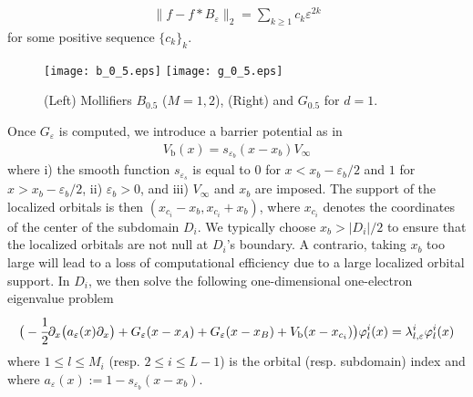 \documentclass[11pt]{elsarticle}
\let \leq \leqslant
\let \geq \geqslant
\let \epsilon \varepsilon
\begin{document}
\begin{itemize}
\begin{eqnarray*}
\|f-f*B_{\epsilon}\|_2 = \sum_{k \geq 1}c_{k}\epsilon^{2k}
\end{eqnarray*}
for some positive sequence $\{c_{k}\}_k$.
\begin{figure}[!ht]
\begin{center}
\hspace*{1mm}\texttt{[image: b\_0\_5.eps]}
\hspace*{1mm}\texttt{[image: g\_0\_5.eps]}
\caption{(Left) Mollifiers $B_{0.5}$ ($M=1,2$), (Right) and $G_{0.5}$ for $d=1$.}
\label{beps05}
\end{center}
\end{figure}
Once $G_{\epsilon}$ is computed, we introduce a barrier potential as in \cite{CAM15-09}
\begin{eqnarray}\label{BARPOT}
V_{\textrm{b}}(x) = s_{\epsilon_b}(x-x_b)V_{\infty}
\end{eqnarray}
where i) the smooth function $s_{\epsilon_s}$ is equal to $0$ for $x<x_b-\epsilon_b/2$ and $1$ for $x>x_b-\epsilon_b/2$, ii) $\epsilon_b>0$, and iii) $V_{\infty}$ and $x_b$ are imposed. The support  of the localized orbitals is then $(x_{c_i}-x_b,x_{c_i}+x_b)$, where $x_{c_i}$ denotes the coordinates of the center of the subdomain $D_i$.  We typically choose $x_b > |D_i|/2$ to ensure that the localized orbitals are not null at $D_i$'s boundary. A contrario, taking $x_b$ too large will lead to a loss of computational efficiency due to a large localized orbital support. In $D_i$, we then solve the following one-dimensional one-electron eigenvalue problem 
\begin{eqnarray*}
\big(-\cfrac{1}{2}\partial_{x}\big(a_{\epsilon}(x)\partial_x\big)  + G_{\epsilon}(x-x_A) + G_{\epsilon}(x-x_B) + V_{\textrm{b}}(x-x_{c_i})\big)\varphi_{l}^{i}(x) = \lambda^{i}_{l,\epsilon}\varphi_{l}^{i}(x)
\end{eqnarray*}
where $1\leq l\leq M_i$ (resp. $2 \leq i\leq L-1$) is the orbital (resp. subdomain) index and where $a_{\epsilon}(x):=1-s_{\epsilon_b}(x-x_b)$.

\end{itemize}
\end{document}
